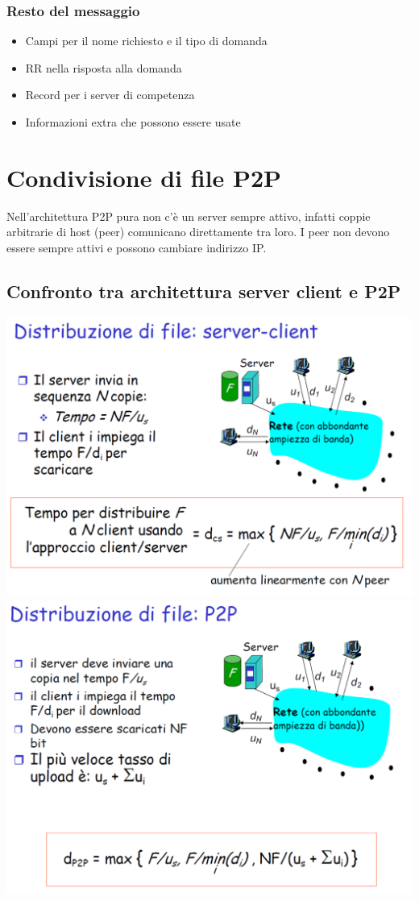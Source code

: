 \documentclass{report}
\begin{document}
	\subsubsection{Resto del messaggio}
	\begin{itemize}
		\item Campi per il nome richiesto e il tipo di domanda
		\item RR nella risposta alla domanda
		\item Record per i server di competenza
		\item Informazioni extra che possono essere usate
	\end{itemize}
	\newpage
	\section{Condivisione di file P2P}
	Nell'architettura P2P pura non c'è un server sempre attivo, infatti coppie arbitrarie di host (peer) comunicano direttamente tra loro. I peer non devono essere sempre attivi e possono cambiare indirizzo IP.
	\subsection{Confronto tra architettura server client e P2P}
	\begin{center}
		\includegraphics[width=0.7\linewidth]{server-client.png}
		\medskip\\
		\includegraphics[width=0.7\linewidth]{p2p.png}
	\end{center}
\end{document}
